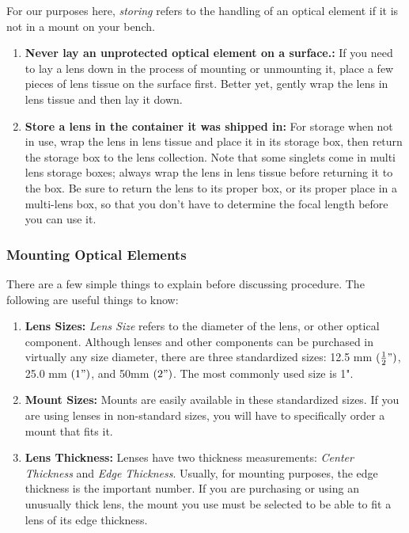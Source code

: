 \documentclass[11pt]{article}
\begin{document}
For our purposes here, \textit{storing} refers to the handling of an optical element if it is not in a mount on your bench.

\begin{enumerate}[noitemsep]
   \item \textbf{Never lay an unprotected optical element on a surface.:} If you need to lay a lens down in the process of mounting or unmounting it, place a few pieces of lens tissue on the surface first. Better yet, gently wrap the lens in lens tissue and then lay it down.
   \item \textbf{Store a lens in the container it was shipped in:} For storage when not in use, wrap the lens in lens tissue and place it in its storage box, then return the storage box to the lens collection. Note that some singlets come in multi lens storage boxes; always wrap the lens in lens tissue before returning it to the box. Be sure to return the lens to its proper box, or its proper place in a multi-lens box, so that you don't have to determine the focal length before you can use it.
\end{enumerate}

\subsubsection{Mounting Optical Elements}

There are a few simple things to explain before discussing procedure. The following are useful things to know:

\begin{enumerate}[noitemsep]
   \item \textbf{Lens Sizes:} \textit{Lens Size} refers to the diameter of the lens, or other optical component. Although lenses and other components can be purchased in virtually any size diameter, there are three standardized sizes: 12.5 mm $(\frac{1}{2}")$, 25.0 mm $(1")$, and 50mm $(2")$. The most commonly used size is 1".
   \item \textbf{Mount Sizes:} Mounts are easily available in these standardized sizes. If you are using lenses in non-standard sizes, you will have to specifically order a mount that fits it.
   \item \textbf{Lens Thickness:} Lenses have two thickness measurements: \textit{Center Thickness} and \textit{Edge Thickness}. Usually, for mounting purposes, the edge thickness is the important number. If you are purchasing or using an unusually thick lens, the mount you use must be selected to be able to fit a lens of its edge thickness.
\end{enumerate}
\end{document}
